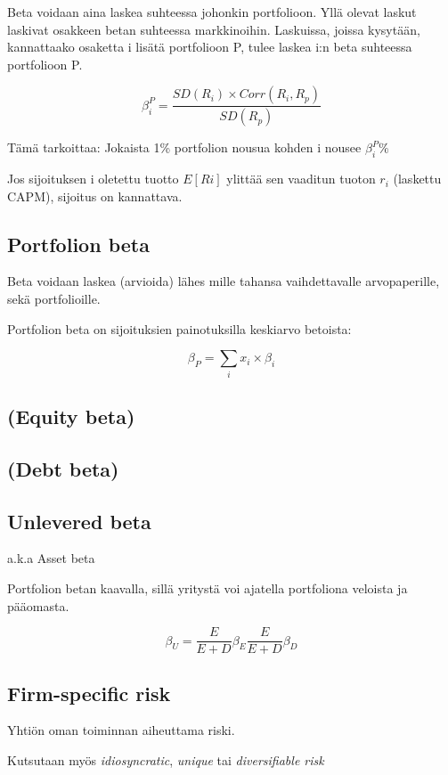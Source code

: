 \documentclass[a4paper]{article}
\begin{document}
Beta voidaan aina laskea suhteessa johonkin portfolioon. Yllä olevat laskut laskivat osakkeen betan suhteessa markkinoihin. Laskuissa, joissa kysytään, kannattaako osaketta i lisätä portfolioon P, tulee laskea i:n beta suhteessa portfolioon P.

\[
    \beta_i^P = \frac{SD(R_i) \times Corr(R_i, R_p)}{SD(R_p)}
\]

Tämä tarkoittaa: Jokaista 1\% portfolion nousua kohden i nousee $\beta_i^P\%$

Jos sijoituksen i oletettu tuotto $E[Ri]$ ylittää sen vaaditun tuoton $r_i$ (laskettu CAPM), sijoitus on kannattava.

\subsection{Portfolion beta}

Beta voidaan laskea (arvioida) lähes mille tahansa vaihdettavalle arvopaperille, sekä portfolioille.

Portfolion beta on sijoituksien painotuksilla keskiarvo betoista:

\[
    \beta_P = \sum_{i} x_i \times \beta_i
\]

\subsection{(Equity beta)}

\subsection{(Debt beta)}

\subsection{Unlevered beta}

a.k.a Asset beta

Portfolion betan kaavalla, sillä yritystä voi ajatella portfoliona veloista ja pääomasta.

\[
    \beta_U = \frac{E}{E + D} \beta_E \frac{E}{E + D} \beta_D
\]

\subsection{Firm-specific risk}

Yhtiön oman toiminnan aiheuttama riski.

Kutsutaan myös \textit{idiosyncratic}, \textit{unique} tai \textit{diversifiable risk}
\end{document}
